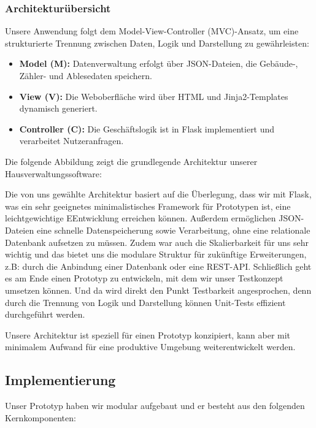 \subsubsection{Architekturübersicht}

Unsere Anwendung folgt dem Model-View-Controller (MVC)-Ansatz, um eine strukturierte Trennung zwischen Daten, Logik und Darstellung zu gewährleisten:
\begin{itemize}
    \item \textbf{Model (M):} Datenverwaltung erfolgt über JSON-Dateien, die Gebäude-, Zähler- und Ablesedaten speichern.
    \item \textbf{View (V):} Die Weboberfläche wird über HTML und Jinja2-Templates dynamisch generiert.
    \item \textbf{Controller (C):} Die Geschäftslogik ist in Flask implementiert und verarbeitet Nutzeranfragen.
\end{itemize}

Die folgende Abbildung zeigt die grundlegende Architektur unserer Hausverwaltungssoftware:

Die von uns gewählte Architektur basiert auf die Überlegung, dass wir mit Flask, was ein sehr geeignetes minimalistisches Framework für Prototypen ist, eine leichtgewichtige EEntwicklung erreichen können.
Außerdem ermöglichen JSON-Dateien eine schnelle Datenspeicherung sowie Verarbeitung, ohne eine relationale Datenbank aufsetzen zu müssen.
Zudem war auch die Skalierbarkeit für uns sehr wichtig und das bietet uns die modulare Struktur für zukünftige Erweiterungen, z.B: durch die Anbindung einer Datenbank oder eine REST-API.
Schließlich geht es am Ende einen Prototyp zu entwickeln, mit dem wir unser Testkonzept umsetzen können.
Und da wird direkt den Punkt Testbarkeit angesprochen, denn durch die Trennung von Logik und Darstellung können Unit-Tests effizient durchgeführt werden.

Unsere Architektur ist speziell für einen Prototyp konzipiert, kann aber mit minimalem Aufwand für eine produktive Umgebung weiterentwickelt werden.

\subsection{Implementierung}\label{subsec:implementierung}

Unser Prototyp haben wir modular aufgebaut und er besteht aus den folgenden Kernkomponenten:

